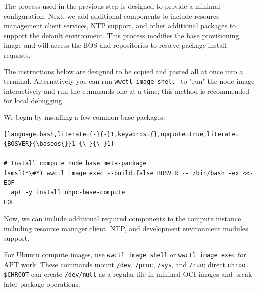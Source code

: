 The process used in the previous step is designed to
provide a minimal \baseOS{} configuration. Next, we add additional components
to include resource management client services, NTP support, and
other additional packages to support the default \OHPC{} environment. This
process modifies the base provisioning image and will access the BOS and \OHPC{}
repositories to resolve package install requests.

The instructions below are designed to be copied and pasted all at once into
a terminal. Alternatively you can run \texttt{wwctl image shell \baseos{}}
to "run" the node image interactively and run the commands one at a time; this
method is recommended for local debugging.

We begin by installing a few common base packages:

\begin{lstlisting}[language=bash,literate={-}{-}1,keywords={},upquote=true,literate={BOSVER}{\baseos{}}1 {\ }{\ }1]

# Install compute node base meta-package
[sms](*\#*) wwctl image exec --build=false BOSVER -- /bin/bash -ex <<- EOF
  apt -y install ohpc-base-compute
EOF
\end{lstlisting}

\noindent Now, we can include additional required components to the compute
instance including resource manager client, NTP, and development environment modules support.

For Ubuntu compute images, use \texttt{wwctl image shell} or \texttt{wwctl image exec}
for APT work. These commands mount \texttt{/dev}, \texttt{/proc}, \texttt{/sys},
and \texttt{/run}; direct \texttt{chroot \$CHROOT} can create \texttt{/dev/null}
as a regular file in minimal OCI images and break later package operations.
